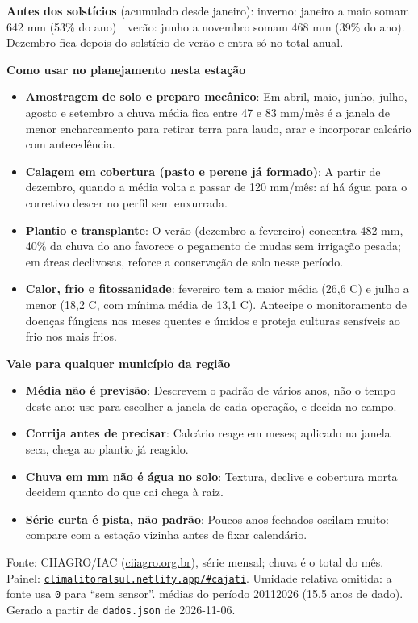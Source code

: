 \documentclass[10pt,a4paper]{article}
\begin{document}
\vspace{1pt}
{\footnotesize\textbf{Antes dos solstícios} (acumulado desde janeiro):
inverno: janeiro a maio somam 642 mm (53\% do ano) \,\textbullet\, verão: junho a novembro somam 468 mm (39\% do ano). Dezembro fica depois do solstício de verão e entra só no total
anual.}

\vspace{2pt}
{\bfseries\small Como usar no planejamento nesta estação}

\footnotesize\begin{itemize}\setlength{\itemsep}{0.5pt}
  \item \textbf{Amostragem de solo e preparo mecânico}: Em abril, maio, junho, julho, agosto e setembro a chuva média fica entre 47 e 83 mm/mês \textemdash{} é a janela de menor encharcamento para retirar terra para laudo, arar e incorporar calcário com antecedência.
  \item \textbf{Calagem em cobertura (pasto e perene já formado)}: A partir de dezembro, quando a média volta a passar de 120 mm/mês: aí há água para o corretivo descer no perfil sem enxurrada.
  \item \textbf{Plantio e transplante}: O verão (dezembro a fevereiro) concentra 482 mm, 40\% da chuva do ano \textemdash{} favorece o pegamento de mudas sem irrigação pesada; em áreas declivosas, reforce a conservação de solo nesse período.
  \item \textbf{Calor, frio e fitossanidade}: fevereiro tem a maior média (26,6 \textdegree{}C) e julho a menor (18,2 \textdegree{}C, com mínima média de 13,1 \textdegree{}C). Antecipe o monitoramento de doenças fúngicas nos meses quentes e úmidos e proteja culturas sensíveis ao frio nos mais frios.
\end{itemize}

\vspace{1pt}
{\bfseries\small Vale para qualquer município da região}

\scriptsize\begin{itemize}\setlength{\itemsep}{0.5pt}
  \item \textbf{Média não é previsão}: Descrevem o padrão de vários anos, não o tempo deste ano: use para escolher a janela de cada operação, e decida no campo.
  \item \textbf{Corrija antes de precisar}: Calcário reage em meses; aplicado na janela seca, chega ao plantio já reagido.
  \item \textbf{Chuva em mm não é água no solo}: Textura, declive e cobertura morta decidem quanto do que cai chega à raiz.
  \item \textbf{Série curta é pista, não padrão}: Poucos anos fechados oscilam muito: compare com a estação vizinha antes de fixar calendário.
\end{itemize}

\vspace{1pt}
{\tiny\color{cinza}
Fonte: CIIAGRO/IAC (\href{http://ciiagro.org.br}{ciiagro.org.br}), série mensal;
chuva é o total do mês. Painel:
\href{https://climalitoralsul.netlify.app/\#cajati}%
{\texttt{climalitoralsul.netlify.app/\#cajati}}.
Umidade relativa omitida: a fonte usa \texttt{0} para ``sem sensor''. 
médias do período 2011\textendash{}2026 (15.5 anos de dado).
Gerado a partir de \texttt{dados.json} de 2026-11-06.}
\end{document}
